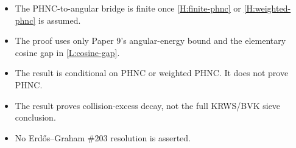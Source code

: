 \documentclass[11pt]{article}
\begin{document}
\begin{itemize}[leftmargin=2em]
\item The PHNC-to-angular bridge is finite once \cref{H:finite-phnc} or \cref{H:weighted-phnc} is assumed.
\item The proof uses only Paper 9's angular-energy bound and the elementary cosine gap in \cref{L:cosine-gap}.
\item The result is conditional on PHNC or weighted PHNC.  It does not prove PHNC.
\item The result proves collision-excess decay, not the full KRWS/BVK sieve conclusion.
\item No Erd\H{o}s--Graham \#203 resolution is asserted.
\end{itemize}
\end{document}
